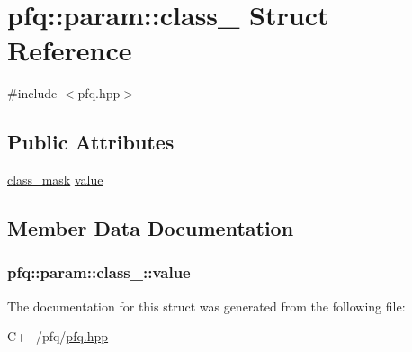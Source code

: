 \hypertarget{structpfq_1_1param_1_1class__}{}\section{pfq\+:\+:param\+:\+:class\+\_\+ Struct Reference}
\label{structpfq_1_1param_1_1class__}


{\ttfamily \#include $<$pfq.\+hpp$>$}

\subsection*{Public Attributes}
\begin{DoxyCompactItemize}
\item 
\hyperlink{namespacepfq_a96af1f5ed530eff563eb917516758fbb}{class\+\_\+mask} \hyperlink{structpfq_1_1param_1_1class___a014cc8b1b64e04bbcd9d8f2ed793efbb}{value}
\end{DoxyCompactItemize}


\subsection{Member Data Documentation}
\subsubsection[{\texorpdfstring{value}{value}}]{ pfq\+::param\+::class\+\_\+\+::value}\hypertarget{structpfq_1_1param_1_1class___a014cc8b1b64e04bbcd9d8f2ed793efbb}{}\label{structpfq_1_1param_1_1class___a014cc8b1b64e04bbcd9d8f2ed793efbb}


The documentation for this struct was generated from the following file\+:\begin{DoxyCompactItemize}
\item 
C++/pfq/\hyperlink{pfq_8hpp}{pfq.\+hpp}\end{DoxyCompactItemize}
